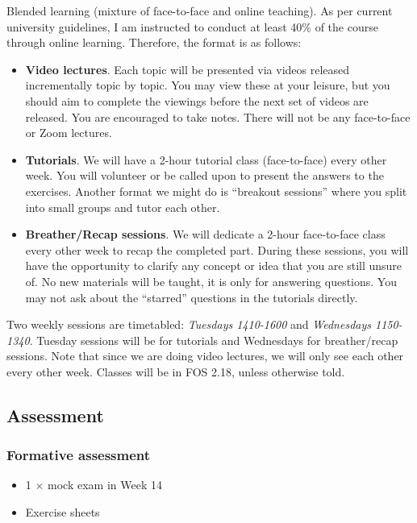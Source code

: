 \documentclass[
]{book}
\providecommand{\tightlist}{%
  \setlength{\itemsep}{0pt}\setlength{\parskip}{0pt}}
\theoremstyle{definition}
\theoremstyle{definition}
\theoremstyle{definition}
\theoremstyle{definition}
\theoremstyle{remark}
\begin{document}
Blended learning (mixture of face-to-face and online teaching). As per current university guidelines, I am instructed to conduct at least 40\% of the course through online learning. Therefore, the format is as follows:

\begin{itemize}
\item
  \textbf{Video lectures}. Each topic will be presented via videos released incrementally topic by topic. You may view these at your leisure, but you should aim to complete the viewings before the next set of videos are released. You are encouraged to take notes. There will not be any face-to-face or Zoom lectures.
\item
  \textbf{Tutorials}. We will have a 2-hour tutorial class (face-to-face) every other week. You will volunteer or be called upon to present the answers to the exercises. Another format we might do is ``breakout sessions'' where you split into small groups and tutor each other.
\item
  \textbf{Breather/Recap sessions}. We will dedicate a 2-hour face-to-face class every other week to recap the completed part. During these sessions, you will have the opportunity to clarify any concept or idea that you are still unsure of. No new materials will be taught, it is only for answering questions. You may not ask about the ``starred'' questions in the tutorials directly.
\end{itemize}

Two weekly sessions are timetabled: \emph{Tuesdays 1410-1600} and \emph{Wednesdays 1150-1340}. Tuesday sessions will be for tutorials and Wednesdays for breather/recap sessions.
Note that since we are doing video lectures, we will only see each other every other week.
Classes will be in FOS 2.18, unless otherwise told.

\hypertarget{assessment}{%
\subsection*{Assessment}\label{assessment}}

\hypertarget{formative-assessment}{%
\subsubsection*{Formative assessment}\label{formative-assessment}}

\begin{itemize}
\tightlist
\item
  1 \(\times\) mock exam in Week 14
\item
  Exercise sheets
\end{itemize}
\end{document}
